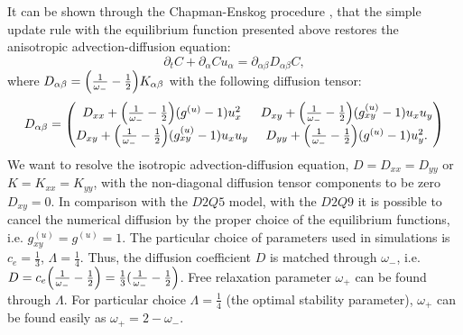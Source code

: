 \documentclass{article}
\newcommand{\beq}{\begin{equation}}
\newcommand{\feq}{\end{equation}}
\newcommand{\omegaplus}{\omega_{+}}
\newcommand{\omegaminus}{\omega_{-}}
\begin{document}
It can be shown through the Chapman-Enskog procedure \cite{chapman}, that the simple update rule
with the equilibrium function presented above restores the anisotropic
advection-diffusion equation:
\beq
\partial_t C+ \partial_{\alpha} C u_{\alpha}=\partial_{\alpha\beta} D_{\alpha\beta} C,
\feq
where $D_{\alpha\beta}=\Bigl(\frac{1}{\omegaminus}-\frac{1}{2}\Bigr)K_{\alpha\beta}$
with the
following diffusion tensor:
\begin{equation}
D_{\alpha\beta}=
\begin{pmatrix}
D_{xx} + \Bigl(\frac{1}{\omegaminus}-\frac{1}{2}\Bigr)(g^{(u)}-1) u_x^2 &
D_{xy}+\Bigl(\frac{1}{\omegaminus}-\frac{1}{2}\Bigr)(g_{xy}^{(u)}-1)u_x u_y\\
D_{xy} + \Bigl(\frac{1}{\omegaminus}-\frac{1}{2}\Bigr)(g_{xy}^{(u)}-1) u_x u_y&
D_{yy}+\Bigl(\frac{1}{\omegaminus}-\frac{1}{2}\Bigr)(g^{(u)}-1) u_y^2. 
\end{pmatrix}
\end{equation}
We want to resolve the isotropic advection-diffusion equation, $D=D_{xx}=D_{yy}$ or
$K=K_{xx}=K_{yy}$, with the non-diagonal diffusion tensor components to be zero $D_{xy}=0$. In
comparison with the $D2Q5$ model, with the $D2Q9$ it is
possible to cancel the numerical diffusion by the proper choice
of the equilibrium functions, i.e. $g_{xy}^{(u)}=g^{(u)}=1$.  The particular choice of parameters
used in simulations is $c_e=\frac{1}{3}$, $\Lambda=\frac{1}{4}$. Thus, the diffusion coefficient $D$
is matched through $\omegaminus$, i.e. $D=c_e
\Bigl(\frac{1}{\omegaminus}-\frac{1}{2}\Bigr)=\frac{1}{3}(\frac{1}{\omegaminus}-\frac{1}{2}\Bigr)$.
 Free relaxation parameter $\omegaplus$ can be found through $\Lambda$. For particular
choice $\Lambda=\frac{1}{4}$ (the optimal stability parameter), $\omegaplus$ can be found easily as
 $\omegaplus=2-\omegaminus$.  

\end{document}

